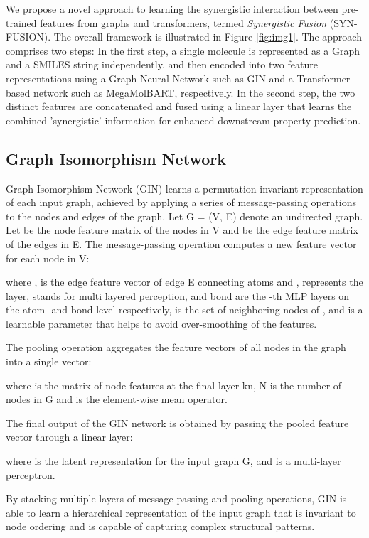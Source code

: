 \documentclass[sigconf,nonacm]{acmart}
\begin{document}
We propose a novel approach to learning the synergistic interaction between pre-trained features from graphs and transformers, termed \textit{Synergistic Fusion} (SYN-FUSION). The overall framework is illustrated in Figure \ref{fig:img1}. The approach comprises two steps: In the first step, a single molecule is represented as a Graph and a SMILES string independently, and then encoded into two feature representations using a Graph Neural Network such as GIN and a Transformer based network such as MegaMolBART, respectively. In the second step, the two distinct features are concatenated and fused using a linear layer that learns the combined 'synergistic' information for enhanced downstream property prediction.

\subsection{Graph Isomorphism Network}
Graph Isomorphism Network (GIN) \cite{DBLP:conf/iclr/XuHLJ19} learns a permutation-invariant representation of each input graph, achieved by applying a series of message-passing operations to the nodes and edges of the graph.
Let G = (V, E) denote an undirected graph. 
Let  be the node feature matrix of the nodes in V and  be the edge feature matrix of the edges in E. The message-passing operation computes a new feature vector  for each node in V:






where ,  is the edge feature vector of edge   E connecting atoms  and ,  represents the  layer,  stands for multi layered perception, 
 and 
bond are the -th MLP layers on the atom- and
bond-level respectively,  is the set of neighboring nodes of , and  is a learnable parameter that helps to avoid over-smoothing of the features.


The pooling operation aggregates the feature vectors of all nodes in the graph into a single vector:

where  is the matrix of node features at the final layer kn, N is the number of nodes in G and   is the element-wise mean operator.

The final output of the GIN network is obtained by passing the pooled feature vector through a linear layer:


where  is the latent representation for the input graph G, and  is a multi-layer perceptron.

By stacking multiple layers of message passing and pooling operations, GIN is able to learn a hierarchical representation of the input graph that is invariant to node ordering and is capable of capturing complex structural patterns.
\end{document}
